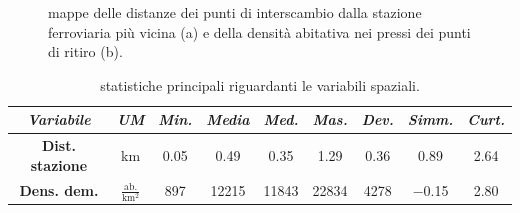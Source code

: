 \begin{figure}[htpb]
	\centering
	\quad
	\quad
	\caption[Mappe delle distanze dei punti di interscambio dalla stazione ferroviaria più vicina e della densità abitativa nei pressi dei punti di ritiro]{mappe delle distanze dei punti di interscambio dalla stazione ferroviaria più vicina (a) e della densità abitativa nei pressi dei punti di ritiro (b).}
	\label{mappe_variabili_spaziali}
\end{figure}

\begin{table}[htpb]
	\centering
	\renewcommand\arraystretch{1.5}
	\begin{tabular}{c|c|c|c|c|c|c|c|c}
		\hline
		\textit{Variabile} & \textit{UM} & \textit{Min.} & \textit{Media} & \textit{Med.} & \textit{Mas.} & \textit{Dev.} & \textit{Simm.}  & \textit{Curt.} \\
		\hline
		\textbf{Dist. stazione} & \unit{\kilo\meter} & \num{0.05} & \num{0.49} & \num{0.35} & \num{1.29} & \num{0.36} & \num{0.89} & \num{2.64} \\
		\hline
		\textbf{Dens. dem.} & $\frac{\text{ab.}}{\unit{\kilo\meter\squared}}$ & \num{897} & \num{12215} & \num{11843} & \num{22834} & \num{4278} & \num{-0.15} & \num{2.80} \\
		\hline
	\end{tabular}
	\caption[Statistiche principali riguardanti le variabili spaziali]{statistiche principali riguardanti le variabili spaziali.}
	\label{statistiche_variabili_spaziali}
\end{table} 

